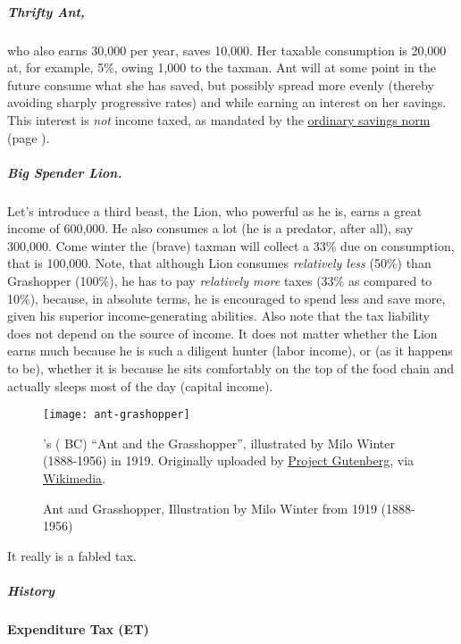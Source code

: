 \subparagraph{Thrifty Ant,}
who also earns 30,000 per year, saves 10,000.
Her taxable consumption is 20,000 at, for example, 5\%, owing 1,000 to the taxman.
Ant will at some point in the future consume what she has saved, but possibly spread more evenly (thereby avoiding sharply progressive rates) and while earning an interest on her savings.
This interest is \emph{not} income taxed, as mandated by the \hyperref[sec:TwoSavingsNorms]{ordinary savings norm} (page \pageref{sec:TwoSavingsNorms}).

\subparagraph{Big Spender Lion.}
Let's introduce a third beast, the Lion, who powerful as he is, earns a great income of 600,000.
He also consumes a lot (he is a predator, after all), say 300,000.
Come winter the (brave) taxman will collect a 33\% due on consumption, that is 100,000.
Note, that although Lion consumes \emph{relatively less} (50\%) than Grashopper (100\%), he has to pay \emph{relatively more} taxes (33\% as compared to 10\%), because, in absolute terms, he is encouraged to spend less and save more, given his superior income-generating abilities.
Also note that the tax liability does not depend on the source of income.
It does not matter whether the Lion earns much because he is such a diligent hunter (labor income), or (as it happens to be), whether it is because he sits comfortably on the top of the food chain and actually sleeps most of the day (capital income).

\begin{figure}[htbp]
	\centering
	\label{fig:ant-grashopper}
	\texttt{[image: ant-grashopper]}
	\caption[Ant and Grashopper]{Ant and Grasshopper, Illustration by Milo Winter from 1919 (1888-1956)}
	\begin{flushleft}
		\scriptsize{\citeauthor{Aesop}'s (\citeyear{Aesop} BC) ``Ant and the Grasshopper'', illustrated by Milo Winter (1888-1956) in 1919.
Originally uploaded by \href{http://www.gutenberg.org/etext/19994}{Project Gutenberg}, via \href{http://commons.wikimedia.org/wiki/File:The-Ant-and-the-Grasshopper---Project-Gutenberg-etext-19994.jpg}{Wikimedia}}.
	\end{flushleft}
\end{figure}

It really is a fabled tax.

\subparagraph{History}

\paragraph{Expenditure Tax (ET)}
	\label{sec:ET}

